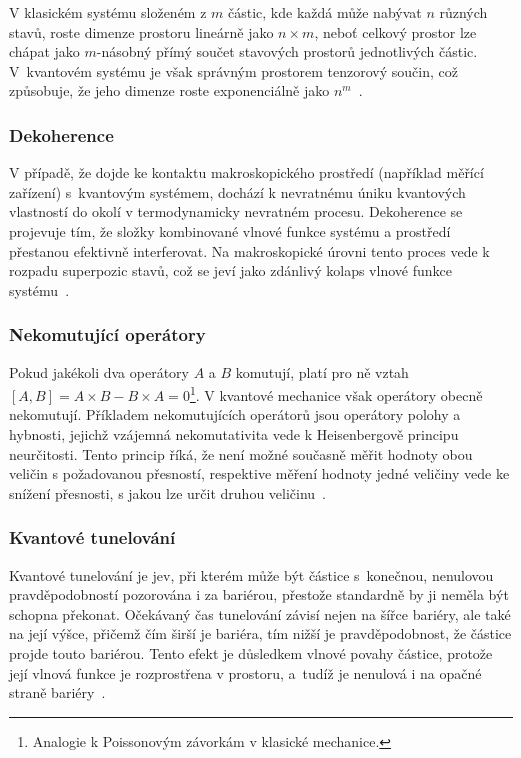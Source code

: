 V klasickém systému složeném z $m$ částic, kde každá může nabývat $n$ různých stavů, roste dimenze prostoru lineárně jako $n \times m$, neboť celkový prostor lze chápat jako \mbox{$m$-násobný} přímý součet stavových prostorů jednotlivých částic. 
V~kvantovém systému je však správným prostorem tenzorový součin, což způsobuje, že jeho dimenze roste exponenciálně jako $n^m$~\cite{NaturalComputing,QuantumComputing-QuantumInformation}.

\subsubsection*{Dekoherence}
V případě, že dojde ke kontaktu makroskopického prostředí (například měřící zařízení) s~kvantovým systémem, dochází k nevratnému úniku kvantových vlastností do okolí v termodynamicky nevratném procesu. 
Dekoherence se projevuje tím, že složky kombinované vlnové funkce systému a prostředí přestanou efektivně interferovat.
Na makroskopické úrovni tento proces vede k rozpadu superpozic stavů, což se jeví jako zdánlivý kolaps vlnové funkce systému~\cite{NaturalComputing}.

\subsubsection*{Nekomutující operátory}
Pokud jakékoli dva operátory $A$ a $B$ komutují, platí pro ně vztah $\left[A, B \right] = A \times B - B \times A = 0$\footnote{Analogie k Poissonovým závorkám v klasické mechanice.}. 
V kvantové mechanice však operátory obecně nekomutují. 
Příkladem nekomutujících operátorů jsou operátory polohy a hybnosti, jejichž vzájemná nekomutativita vede k Heisenbergově principu neurčitosti.
Tento princip říká, že není možné současně měřit hodnoty obou veličin s požadovanou přesností, respektive měření hodnoty jedné veličiny vede ke snížení přesnosti, s jakou lze určit druhou veličinu~\cite{NaturalComputing,QuantumMeasurement}.

\subsubsection*{Kvantové tunelování}
Kvantové tunelování je jev, při kterém může být částice s~konečnou, nenulovou pravděpodobností pozorována i za bariérou, přestože standardně by ji neměla být schopna překonat. 
Očekávaný čas tunelování závisí nejen na šířce bariéry, ale také na její výšce, přičemž čím širší je bariéra, tím nižší je pravděpodobnost, že částice projde touto bariérou. 
Tento efekt je důsledkem vlnové povahy částice, protože její vlnová funkce je rozprostřena v prostoru, a~tudíž je nenulová i na opačné straně bariéry~\cite{NaturalComputing}. 

